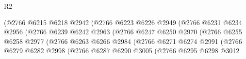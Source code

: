 \begin{lexlean}{R2}
\begin{coremodule}
                                          (@2766
                                            @6215
                                            @6218
                                            @2942
                                            (@2766
                                              @6223
                                              @6226
                                              @2949
                                              (@2766
                                                @6231
                                                @6234
                                                @2956
                                                (@2766
                                                  @6239
                                                  @6242
                                                  @2963
                                                  (@2766
                                                    @6247
                                                    @6250
                                                    @2970
                                                    (@2766
                                                      @6255
                                                      @6258
                                                      @2977
                                                      (@2766
                                                        @6263
                                                        @6266
                                                        @2984
                                                        (@2766
                                                          @6271
                                                          @6274
                                                          @2991
                                                          (@2766
                                                            @6279
                                                            @6282
                                                            @2998
                                                            (@2766
                                                              @6287
                                                              @6290
                                                              @3005
                                                              (@2766
                                                                @6295
                                                                @6298
                                                                @3012

\end{coremodule}
\end{lexlean}
